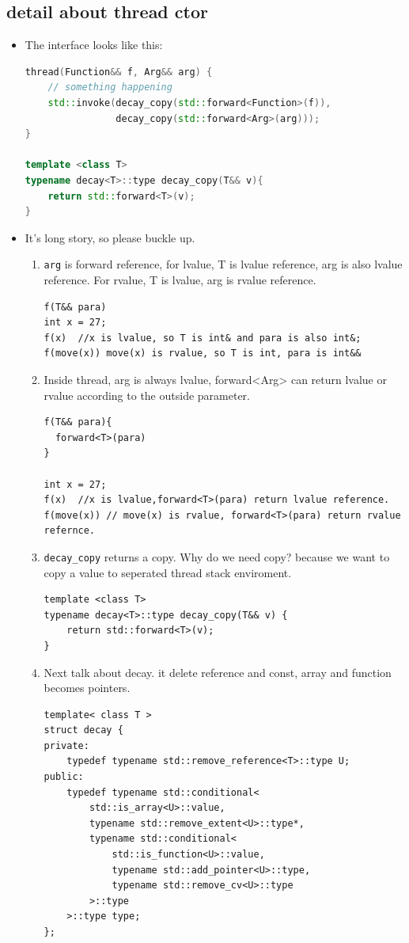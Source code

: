 \documentclass[a4paper,11pt,twoside]{book}
\begin{document}
\subsection{detail about thread ctor}

\begin{itemize}
		\item The interface looks like this:
\begin{lstlisting}[frame=single, language=c++]
thread(Function&& f, Arg&& arg) {
	// something happening
	std::invoke(decay_copy(std::forward<Function>(f)),
            	decay_copy(std::forward<Arg>(arg)));
}
	
template <class T> 
typename decay<T>::type decay_copy(T&& v){
	return std::forward<T>(v); 
}
\end{lstlisting}
		\item It's long story, so please buckle up.

		\begin{enumerate}
			\item \texttt{arg} is forward reference, for lvalue, T is lvalue reference, arg is also lvalue reference. For rvalue, T is lvalue, arg is rvalue reference. 
\begin{lstlisting}
f(T&& para)
int x = 27;
f(x)  //x is lvalue, so T is int& and para is also int&;
f(move(x)) move(x) is rvalue, so T is int, para is int&&
\end{lstlisting}
		\item Inside thread, arg is always lvalue, forward<Arg> can return lvalue or rvalue according to the outside parameter. 
\begin{lstlisting}
f(T&& para){
  forward<T>(para)
}

int x = 27;
f(x)  //x is lvalue,forward<T>(para) return lvalue reference. 
f(move(x)) // move(x) is rvalue, forward<T>(para) return rvalue refernce. 
\end{lstlisting}

		\item \texttt{decay\_copy} returns a copy. Why do we need copy? because we want to copy a value to seperated thread stack enviroment. 
\begin{lstlisting}
template <class T>
typename decay<T>::type decay_copy(T&& v) {
    return std::forward<T>(v);
}
\end{lstlisting}

		\item Next talk about decay. it delete reference and const, array and function becomes pointers.
\begin{lstlisting}
template< class T >
struct decay {
private:
    typedef typename std::remove_reference<T>::type U;
public:
    typedef typename std::conditional< 
        std::is_array<U>::value,
        typename std::remove_extent<U>::type*,
        typename std::conditional< 
            std::is_function<U>::value,
            typename std::add_pointer<U>::type,
            typename std::remove_cv<U>::type
        >::type
    >::type type;
};
\end{lstlisting}
	

\end{enumerate}
\end{itemize}
\end{document}
